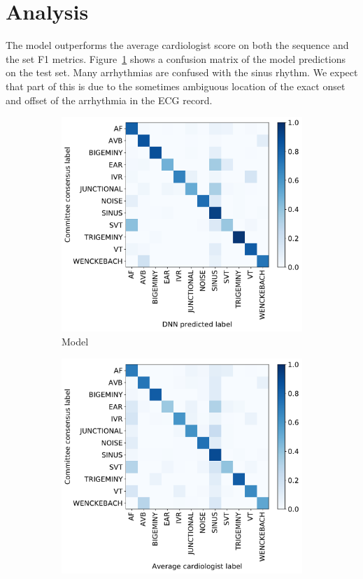 \section{Analysis}

The model outperforms the average cardiologist score on both the sequence and
the set F1 metrics. Figure~\ref{fig:arrhythmias:model_confusion} shows a
confusion matrix of the model predictions on the test set. Many arrhythmias are
confused with the sinus rhythm. We expect that part of this is due to the
sometimes ambiguous location of the exact onset and offset of the arrhythmia in
the ECG record.

\begin{figure}
\begin{subfigure}{.5\textwidth}
  \centering
  \includegraphics[width=0.9\linewidth]{arrhythmias/figures/model_confusions.pdf}
  \caption{Model}
  \label{fig:arrhythmias:model_confusion}
\end{subfigure}
\begin{subfigure}{.5\textwidth}
  \centering
  \includegraphics[width=0.9\linewidth]{arrhythmias/figures/human_confusions.pdf}

\end{subfigure}
\end{figure}
